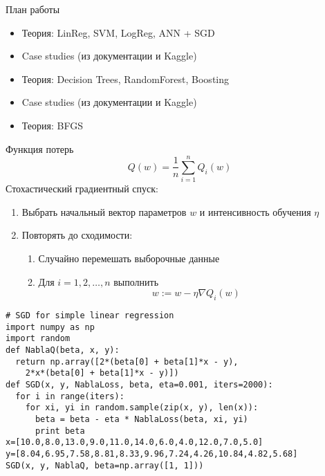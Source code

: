 \documentclass[landscape]{slides}
\begin{document}
\begin{slide}
План работы
\begin{itemize}
\item Теория: LinReg, SVM, LogReg, ANN + SGD
\item Case studies (из документации и Kaggle)
\item Теория: Decision Trees, RandomForest, Boosting
\item Case studies (из документации и Kaggle)
\item Теория: BFGS
\end{itemize}
\end{slide}


\begin{slide}
Функция потерь
$$ Q(w) = \frac 1n \sum_{i=1}^n Q_i(w) $$
Стохастический градиентный спуск:
\begin{enumerate}
\item Выбрать начальный вектор параметров $w$ и интенсивность обучения $\eta$
\item Повторять до сходимости:
\begin{enumerate}
\item Случайно перемешать выборочные данные
\item Для $i=1,2,\ldots,n$ выполнить
$$
w:= w - \eta \nabla Q_i(w)
$$
\end{enumerate}
\end{enumerate}
\end{slide}


\begin{slide}
\begin{verbatim}
# SGD for simple linear regression
import numpy as np
import random
def NablaQ(beta, x, y):
  return np.array([2*(beta[0] + beta[1]*x - y),
    2*x*(beta[0] + beta[1]*x - y)])
def SGD(x, y, NablaLoss, beta, eta=0.001, iters=2000):
  for i in range(iters):
    for xi, yi in random.sample(zip(x, y), len(x)):
      beta = beta - eta * NablaLoss(beta, xi, yi)
      print beta
x=[10.0,8.0,13.0,9.0,11.0,14.0,6.0,4.0,12.0,7.0,5.0]
y=[8.04,6.95,7.58,8.81,8.33,9.96,7.24,4.26,10.84,4.82,5.68]
SGD(x, y, NablaQ, beta=np.array([1, 1]))
\end{verbatim}
\end{slide}


\end{document}
